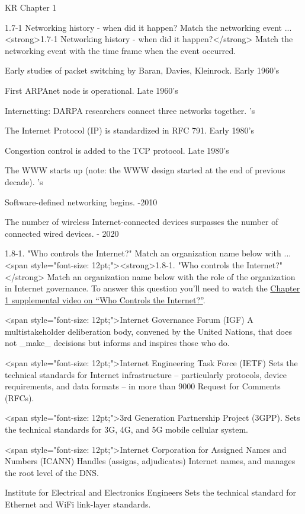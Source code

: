 \documentclass[a4paper]{article}
\begin{document}
\begin{quiz}{KR Chapter 1}
\begin{matching}[
	points=1,
	penalty=0.33333,
]{1.7-1 Networking history - when did it happen? Match the networking event ...}
<strong>1.7-1 Networking history - when did it happen?</strong> Match the networking event with the time frame when the event occurred.
\item Early studies of packet switching by Baran, Davies, Kleinrock. \answer Early 1960's
\item First ARPAnet node is operational. \answer Late 1960's
\item Internetting: DARPA researchers connect three networks together. 's
\item The Internet Protocol (IP) is standardized in RFC 791. \answer Early 1980's
\item Congestion control is added to the TCP protocol. \answer Late 1980's
\item The WWW starts up (note: the WWW design started at the end of previous decade). 's
\item Software-defined networking begins. -2010
\item The number of wireless Internet-connected devices surpasses the number of connected wired devices.  - 2020
\end{matching}

\begin{matching}[
	points=1,
	penalty=0.33333,
]{1.8-1.  "Who controls the Internet?"  Match an organization name below with ...}
<span style="font-size: 12pt;"><strong>1.8-1.  "Who controls the Internet?"</strong>  Match an organization name below with the role of the organization in Internet governance. To answer this question you’ll need to watch the \href{https://www.youtube.com/watch?v=xrd4hD_9fS8}{Chapter 1 supplemental video on “Who Controls the Internet?”}.
\item <span style="font-size: 12pt;">Internet Governance Forum (IGF)  \answer A multistakeholder deliberation body, convened by the United Nations, that does not _make_ decisions but informs and inspires those who do.
\item <span style="font-size: 12pt;">Internet Engineering Task Force (IETF) \answer Sets the technical standards for Internet infrastructure -- particularly protocols, device requirements, and data formats -- in more than 9000 Request for Comments (RFCs).
\item <span style="font-size: 12pt;">3rd Generation Partnership Project (3GPP). \answer Sets the technical standards for 3G, 4G, and 5G mobile cellular system.
\item <span style="font-size: 12pt;">Internet Corporation for Assigned Names and Numbers (ICANN) \answer Handles (assigns, adjudicates) Internet names, and manages the root level of the DNS.
\item Institute for Electrical and Electronics Engineers \answer Sets the technical standard for Ethernet and WiFi link-layer standards.
\end{matching}


\end{quiz}
\end{document}
